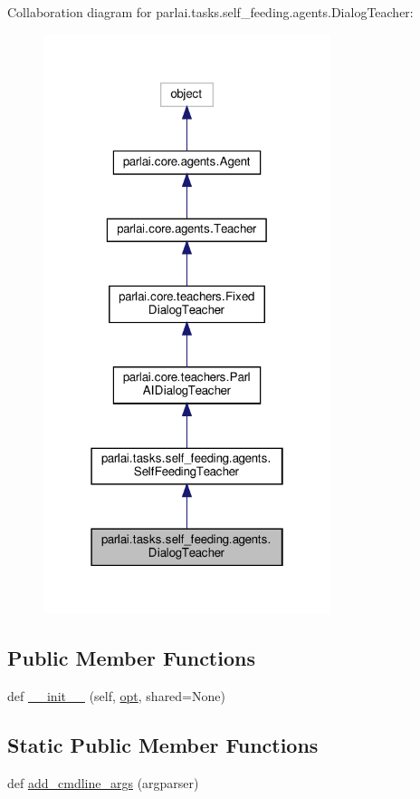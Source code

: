Collaboration diagram for parlai.\+tasks.\+self\+\_\+feeding.\+agents.\+Dialog\+Teacher\+:
\nopagebreak
\begin{figure}[H]
\begin{center}
\leavevmode
\includegraphics[width=238pt]{classparlai_1_1tasks_1_1self__feeding_1_1agents_1_1DialogTeacher__coll__graph}
\end{center}
\end{figure}
\subsection*{Public Member Functions}
\begin{DoxyCompactItemize}
\item 
def \hyperlink{classparlai_1_1tasks_1_1self__feeding_1_1agents_1_1DialogTeacher_a4d54bccea69db40c88a1a9c83b0bad78}{\+\_\+\+\_\+init\+\_\+\+\_\+} (self, \hyperlink{classparlai_1_1core_1_1agents_1_1Teacher_a3ce6243860ce978a897922863ed32fa4}{opt}, shared=None)
\end{DoxyCompactItemize}
\subsection*{Static Public Member Functions}
\begin{DoxyCompactItemize}
\item 
def \hyperlink{classparlai_1_1tasks_1_1self__feeding_1_1agents_1_1DialogTeacher_a69b92c60fafef817217b21de44379117}{add\+\_\+cmdline\+\_\+args} (argparser)
\end{DoxyCompactItemize}
